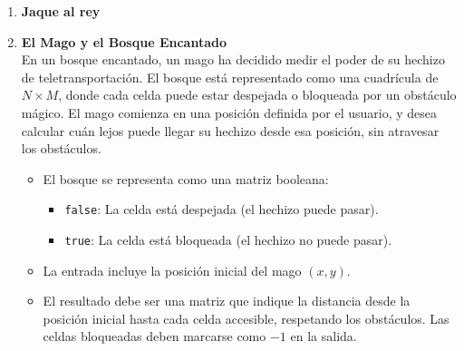 \begin{enumerate}
    \item \textbf{Jaque al rey}\\
    

    \item \textbf{El Mago y el Bosque Encantado}\\
    En un bosque encantado, un mago ha decidido medir el poder de su hechizo de teletransportación. El bosque está representado como una cuadrícula de \(N \times M\), donde cada celda puede estar despejada o bloqueada por un obstáculo mágico. El mago comienza en una posición definida por el usuario, y desea calcular cuán lejos puede llegar su hechizo desde esa posición, sin atravesar los obstáculos.
    \begin{itemize}
        \item El bosque se representa como una matriz booleana: 
        \begin{itemize}
            \item \texttt{false}: La celda está despejada (el hechizo puede pasar).  
            \item \texttt{true}: La celda está bloqueada (el hechizo no puede pasar).  
        \end{itemize}
        \item La entrada incluye la posición inicial del mago \((x, y)\).  
        \item El resultado debe ser una matriz que indique la distancia desde la posición inicial hasta cada celda accesible, respetando los obstáculos. Las celdas bloqueadas deben marcarse como \(-1\) en la salida.  
    \end{itemize}


\end{enumerate}
